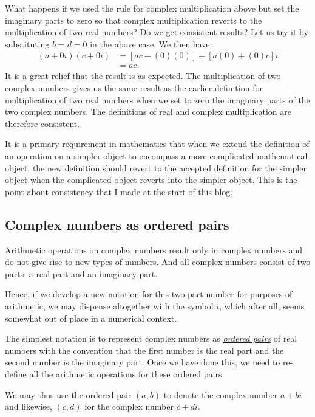 \documentclass[
  a4paper,
]{article}
\begin{document}
What happens if we used the rule for complex multiplication above but
set the imaginary parts to zero so that complex multiplication reverts
to the multiplication of two real numbers? Do we get consistent results?
Let us try it by substituting \(b = d = 0\) in the above case. We then
have: \[
\begin{aligned}
(a + 0i)(c + 0i) & = [ac - (0)(0)] + [a(0) + (0)c]i\\
& = ac.
\end{aligned}
\] It is a great relief that the result is as expected. The
multiplication of two complex numbers gives us the same result as the
earlier definition for multiplication of two real numbers when we set to
zero the imaginary parts of the two complex numbers. The definitions of
real and complex multiplication are therefore consistent.

It is a primary requirement in mathematics that when we extend the
definition of an operation on a simpler object to encompass a more
complicated mathematical object, the new definition should revert to the
accepted definition for the simpler object when the complicated object
reverts into the simpler object. This is the point about consistency
that I made at the start of this blog.

\hypertarget{complex-numbers-as-ordered-pairs}{%
\subsection{Complex numbers as ordered
pairs}\label{complex-numbers-as-ordered-pairs}}

Arithmetic operations on complex numbers result only in complex numbers
and do not give rise to new types of numbers. And all complex numbers
consist of two parts: a real part and an imaginary part.

Hence, if we develop a new notation for this two-part number for
purposes of arithmetic, we may dispense altogether with the symbol
\(i\), which after all, seems somewhat out of place in a numerical
context.

The simplest notation is to represent complex numbers as
\href{http://www.mathsisfun.com/definitions/ordered-pair.html}{\emph{ordered
pairs}} of real numbers with the convention that the first number is the
real part and the second number is the imaginary part. Once we have done
this, we need to re-define all the arithmetic operations for these
ordered pairs.

We may thus use the ordered pair \((a, b)\) to denote the complex number
\(a + bi\) and likewise, \((c, d)\) for the complex number \(c + di\).
\end{document}
